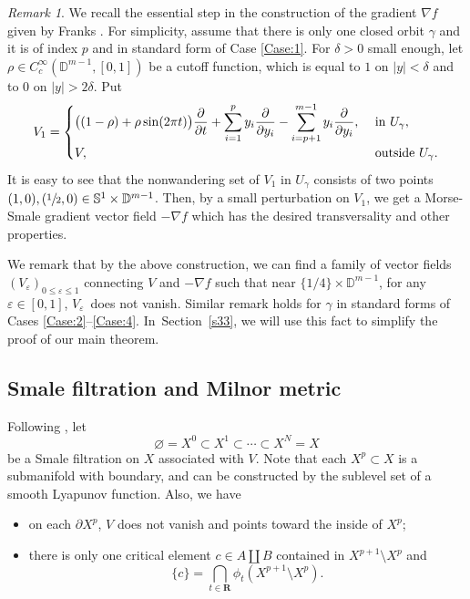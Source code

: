 \documentclass[11pt]{article}
\numberwithin{equation}{section}
\theoremstyle{plain}
\theoremstyle{definition}
\theoremstyle{remark}
\newtheorem{re}[lem]{Remark}
\newcommand{\bR}{\mathbf{R}}
\newcommand{\bbD}{\mathbb{D}}
\newcommand{\bbS}{\mathbb{S}}
\let\p\partial
\let\l\leqslant
\let\e\varepsilon
\begin{document}
\begin{re}\label{reK}We recall the essential step in the
construction of the gradient $\nabla f$ given by Franks \cite[Prop.\,8.5]{Franks1982}. For simplicity, assume that there is only one
closed orbit $\gamma$ and it is of index $p$ and in standard
form of Case \ref{Case:1}.
For $\delta>0$ small enough, let $\rho\in
C^{\infty}_{c}(\bbD^{m-1},[0,1])$
be a cutoff function, which is equal to
$1$ on $|y|<\delta$ and to $0$ on $|y|>2\delta$. Put
\begin{equation*}
V_{1}=
\begin{cases}
\displaystyle
\big((1-\rho)+\rho\sin(2\pi t)\big)\frac{\p}{\p t}+\sum_{i=1}^{p}y_{i}\frac{\p}{\p
y_{i}}-\sum_{i=p+1}^{m-1}y_{i}\frac{\p}{\p y_{i}}, &\hbox{ in
} U_{\gamma},\\
V,& \hbox{ outside } U_{\gamma}.
\end{cases}
\end{equation*}
It is easy to see that the
nonwandering set of $V_{1}$ in $U_{\gamma}$ consists of two
points $(1,0),(\sfrac{1}{2},0)\in
\bbS^{1}\times \bbD^{m-1}$. Then, by a small perturbation on $V_{1}$, we get a Morse-Smale gradient vector
field $-\nabla f$ which
has the desired transversality and other properties.

We remark that by the above construction, we can find a family of vector fields $(V_{\e})_{0\l\e\l1}$ connecting $V$ and
$-\nabla f$ such that near $\{1/4\}\times \bbD^{m-1}$, for
any $ \e\in [0,1]$, $V_{\e}$~does not vanish.
Similar remark holds for $\gamma$ in standard forms of Cases \ref{Case:2}--\ref{Case:4}.
In~Section~\ref{s33}, we will use this fact to simplify the proof of our main theorem.
\end{re}

\subsection{Smale filtration and Milnor metric}\label{sSF}
Following \cite[Def.\,9.10]{Franks1982},
let
\begin{equation}\label{eqSmale}
\varnothing=X^{0}\subset X^{1}\subset\cdots \subset X^{N}=X
\end{equation}
be a Smale filtration on $X$ associated with $V$. Note that each
$X^{p}\subset X$ is a submanifold with boundary, and can be constructed by the sublevel set of a smooth Lyapunov function. Also, we
have
\begin{itemize}
\item on each $\p X^{p}$, $V$ does not vanish and points toward the inside of $X^{p}$;
\item there is only one critical element $c\in A\coprod
B$ contained in $X^{p+1}\setminus
X^{p}$ and
\begin{equation*}
\{c\}=\bigcap_{t\in \bR}\phi_{t}(X^{p+1}\setminus
X^{p}).
\end{equation*}
\end{itemize}
\end{document}
